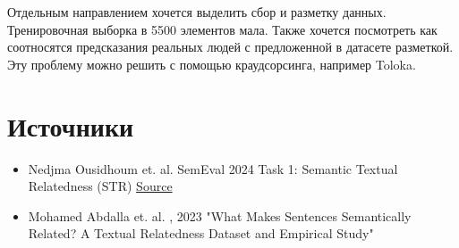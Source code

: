 \documentclass[12pt]{article}
\begin{document}
Отдельным направлением хочется выделить сбор и разметку данных. Тренировочная выборка в 5500 элементов мала. Также хочется посмотреть как соотносятся предсказания реальных людей с предложенной в датасете разметкой. Эту проблему можно решить с помощью краудсорсинга, например Toloka.
\newpage


\section{Источники}
\begin{itemize}
    \item Nedjma Ousidhoum et. al. SemEval 2024 Task 1: Semantic Textual Relatedness (STR)
   \href{https://semantic-textual-relatedness.github.io/}{Source}

   \item Mohamed Abdalla et. al. , 2023 "What Makes Sentences Semantically Related?
   A Textual Relatedness Dataset and Empirical Study"
\end{itemize}
\end{document}
